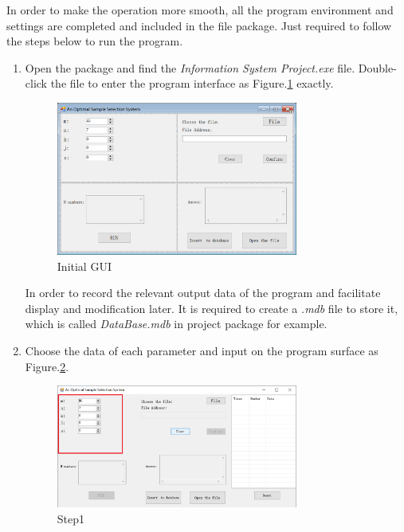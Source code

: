 In order to make the operation more smooth, 
all the program environment and settings are completed and included in the file package. 
Just required to follow the steps below to run the program.
\begin{enumerate}
\item Open the package and find the \emph{Information System Project.exe} file. Double-click the file to enter the program interface as Figure.\ref{fig:init} exactly.
\begin{figure}[!htbp]
	\centering
	\includegraphics[width=0.75\textwidth]{images/initial.png}
	\caption{Initial GUI}
	\label{fig:init}
\end{figure}

In order to record the relevant output data of the program and facilitate display and modification later. 
It is required to create a \emph{.mdb} file to store it, which is called \emph{DataBase.mdb} in project package for example.

\item Choose the data of each parameter and input on the program surface as Figure.\ref{fig:st1}.
\begin{figure}[!htbp]
	\centering
	\includegraphics[width=0.75\textwidth]{images/step1.png}
	\caption{Step1}
	\label{fig:st1}
\end{figure}


\end{enumerate}
